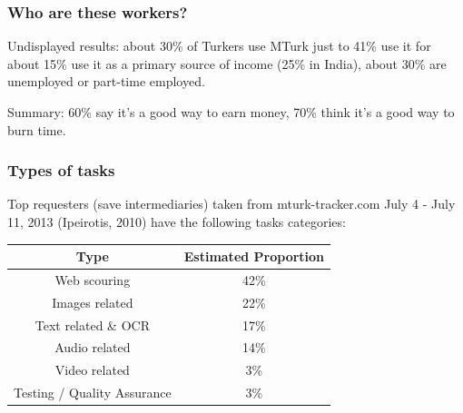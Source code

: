 \documentclass[slides]{beamer} %
\begin{document}
\begin{frame}\frametitle{Who are these workers?}

 \pause

\small

\vspace{-0.2cm}
Undisplayed results: about 30\% of Turkers use MTurk just to  41\% use it for  \pause about 15\% use it as a primary source of income (25\% in India), about 30\% are unemployed or part-time employed. \pause
\vspace{0.2cm}

Summary: 60\% say it's a good way to earn money, 70\% think it's a good way to burn time.

\end{frame}

\begin{frame}\frametitle{Types of tasks}

Top requesters (save intermediaries) taken from mturk-tracker.com July 4 - July 11, 2013 (Ipeirotis, 2010) have the following tasks categories:

\begin{table}
\begin{tabular}{cc}
Type & Estimated Proportion \\ \hline \pause
Web scouring & 42\% \\ \pause
Images related & 22\% \\ \pause
Text related \& OCR & 17\% \\ \pause
Audio related & 14\% \\ \pause
Video related & 3\% \\ \pause
Testing / Quality Assurance & 3\% \\
\end{tabular}
\end{table}

\end{frame}
\end{document}
